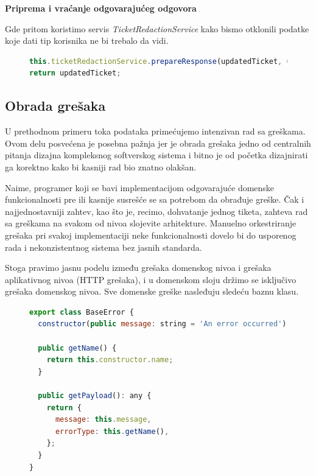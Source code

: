 \documentclass[12pt,oneside]{memoir}
\begin{document}
\newpage
\textbf{Priprema i vraćanje odgovarajućeg odgovora}

Gde pritom koristimo servis \textit{TicketRedactionService} kako bismo otklonili podatke koje dati tip korisnika ne bi trebalo da vidi.
\begin{figure}[h]
\begin{lstlisting}[language=JavaScript, style=ES6, caption={odgovor}]
this.ticketRedactionService.prepareResponse(updatedTicket, user);
return updatedTicket;
\end{lstlisting}
\end{figure}

\newpage
\subsection{Obrada grešaka}

U prethodnom primeru toka podataka primećujemo intenzivan rad sa greškama. Ovom delu posvećena je posebna pažnja jer je obrada grešaka jedno od centralnih pitanja dizajna kompleksnog softverskog sistema i bitno je od početka dizajnirati ga korektno kako bi kasniji rad bio znatno olakšan.

Naime, programer koji se bavi implementacijom odgovarajuće domenske funkcionalnosti pre ili kasnije susrešće se sa potrebom da obrađuje greške. Čak i najjednostavniji zahtev, kao što je, recimo, dohvatanje jednog tiketa, zahteva rad sa greškama na svakom od nivoa slojevite arhitekture. Manuelno orkestriranje grešaka pri svakoj implementaciji neke funkcionalnosti dovelo bi do usporenog rada i nekonzistentnog sistema bez jasnih standarda. 

Stoga pravimo jasnu podelu između grešaka domenskog nivoa i grešaka aplikativnog nivoa (HTTP grešaka), i u domenskom sloju držimo se isključivo grešaka domenskog nivoa. Sve domenske greške nasleđuju sledeću baznu klasu.

\begin{figure}[h]
\begin{lstlisting}[language=JavaScript, style=ES6, caption={BaseError.ts}]
export class BaseError {
  constructor(public message: string = 'An error occurred') {}

  public getName() {
    return this.constructor.name;
  }

  public getPayload(): any {
    return {
      message: this.message,
      errorType: this.getName(),
    };
  }
}
\end{lstlisting}
\end{figure}
\end{document}
